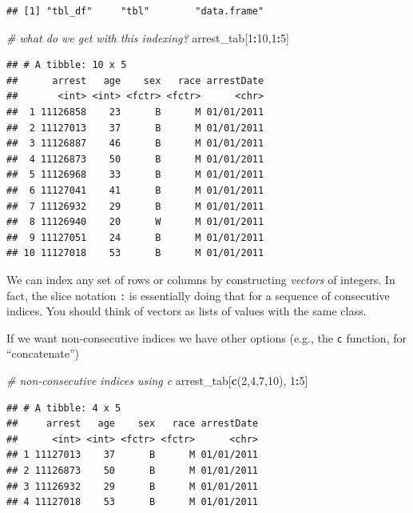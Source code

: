 \documentclass[12pt,]{book}
\newenvironment{Shaded}{\begin{snugshade}}{\end{snugshade}}
\newcommand{\KeywordTok}[1]{\textcolor[rgb]{0.13,0.29,0.53}{\textbf{#1}}}
\newcommand{\DecValTok}[1]{\textcolor[rgb]{0.00,0.00,0.81}{#1}}
\newcommand{\CommentTok}[1]{\textcolor[rgb]{0.56,0.35,0.01}{\textit{#1}}}
\newcommand{\OperatorTok}[1]{\textcolor[rgb]{0.81,0.36,0.00}{\textbf{#1}}}
\newcommand{\NormalTok}[1]{#1}
\theoremstyle{definition}
\theoremstyle{definition}
\theoremstyle{remark}
\begin{document}
\begin{verbatim}
## [1] "tbl_df"     "tbl"        "data.frame"
\end{verbatim}

\begin{Shaded}
\begin{Highlighting}[]
\CommentTok{# what do we get with this indexing?}
\NormalTok{arrest_tab[}\DecValTok{1}\OperatorTok{:}\DecValTok{10}\NormalTok{,}\DecValTok{1}\OperatorTok{:}\DecValTok{5}\NormalTok{]}
\end{Highlighting}
\end{Shaded}

\begin{verbatim}
## # A tibble: 10 x 5
##      arrest   age    sex   race arrestDate
##       <int> <int> <fctr> <fctr>      <chr>
##  1 11126858    23      B      M 01/01/2011
##  2 11127013    37      B      M 01/01/2011
##  3 11126887    46      B      M 01/01/2011
##  4 11126873    50      B      M 01/01/2011
##  5 11126968    33      B      M 01/01/2011
##  6 11127041    41      B      M 01/01/2011
##  7 11126932    29      B      M 01/01/2011
##  8 11126940    20      W      M 01/01/2011
##  9 11127051    24      B      M 01/01/2011
## 10 11127018    53      B      M 01/01/2011
\end{verbatim}

We can index any set of rows or columns by constructing \emph{vectors}
of integers. In fact, the slice notation \texttt{:} is essentially doing
that for a sequence of consecutive indices. You should think of vectors
as lists of values with the same class.

If we want non-consecutive indices we have other options (e.g., the
\texttt{c} function, for ``concatenate'')

\begin{Shaded}
\begin{Highlighting}[]
\CommentTok{# non-consecutive indices using c}
\NormalTok{arrest_tab[}\KeywordTok{c}\NormalTok{(}\DecValTok{2}\NormalTok{,}\DecValTok{4}\NormalTok{,}\DecValTok{7}\NormalTok{,}\DecValTok{10}\NormalTok{), }\DecValTok{1}\OperatorTok{:}\DecValTok{5}\NormalTok{]}
\end{Highlighting}
\end{Shaded}

\begin{verbatim}
## # A tibble: 4 x 5
##     arrest   age    sex   race arrestDate
##      <int> <int> <fctr> <fctr>      <chr>
## 1 11127013    37      B      M 01/01/2011
## 2 11126873    50      B      M 01/01/2011
## 3 11126932    29      B      M 01/01/2011
## 4 11127018    53      B      M 01/01/2011
\end{verbatim}
\end{document}
